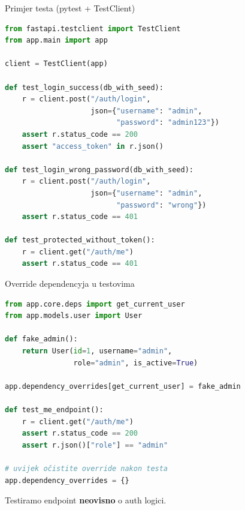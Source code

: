 \begin{frame}[fragile, shrink=10]{Primjer testa (pytest + TestClient)}
\begin{lstlisting}[language=python]
from fastapi.testclient import TestClient
from app.main import app

client = TestClient(app)

def test_login_success(db_with_seed):
    r = client.post("/auth/login",
                    json={"username": "admin",
                          "password": "admin123"})
    assert r.status_code == 200
    assert "access_token" in r.json()

def test_login_wrong_password(db_with_seed):
    r = client.post("/auth/login",
                    json={"username": "admin",
                          "password": "wrong"})
    assert r.status_code == 401

def test_protected_without_token():
    r = client.get("/auth/me")
    assert r.status_code == 401
\end{lstlisting}
\end{frame}

\begin{frame}[fragile,shrink=5]{Override dependencyja u testovima}
\begin{lstlisting}[language=python]
from app.core.deps import get_current_user
from app.models.user import User

def fake_admin():
    return User(id=1, username="admin",
                role="admin", is_active=True)

app.dependency_overrides[get_current_user] = fake_admin

def test_me_endpoint():
    r = client.get("/auth/me")
    assert r.status_code == 200
    assert r.json()["role"] == "admin"

# uvijek očistite override nakon testa
app.dependency_overrides = {}
\end{lstlisting}

	\vspace{0.4em}
	Testiramo endpoint \textbf{neovisno} o auth logici.
\end{frame}


